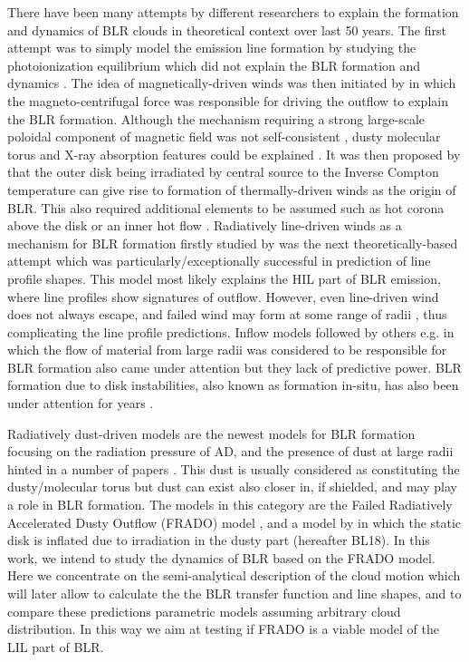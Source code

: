 \documentclass[twocolumn]{aastex62}
\begin{document}
There have been many attempts by different researchers to explain the formation and dynamics of BLR clouds in theoretical context over last 50 years.
The first attempt was to simply model the emission line formation by studying the photoionization equilibrium \citep{Osterbrock1978} which did not explain the BLR formation and dynamics \citep{Capriotti1980}.
The idea of magnetically-driven winds was then initiated by \cite{BlandfordPayne1982} in which the magneto-centrifugal force was responsible for driving the outflow to explain the BLR formation. Although the mechanism requiring a strong large-scale poloidal component of magnetic field was not self-consistent \citep{BalbusHawley1991}, dusty molecular torus and X-ray absorption features could be explained \citep{Elitzur2006, Fukumura2015,Huang2020}.
It was then proposed by \cite{Begelman1983} that the outer disk being irradiated by central source to the Inverse Compton temperature can give rise to formation of thermally-driven winds as the origin of BLR. This also required additional elements to be assumed such as hot corona above the disk or an inner hot flow \citep{Witt1997, BlandfordBegelman1999}. 
Radiatively line-driven winds as a mechanism for BLR formation firstly studied by \citep{murray1995} was the next theoretically-based attempt which was particularly/exceptionally successful in prediction of line profile shapes. This model most likely explains the HIL part of BLR emission, where line profiles show signatures of outflow. However, even line-driven wind does not always escape, and failed wind may form at some range of radii \citep{Risaliti2010}, thus complicating the line profile predictions.
Inflow models \citep{done1996} followed by others e.g. \citep{Hu2008, Wang2017} in which the flow of material from large radii was considered to be responsible for BLR formation also came under attention but they lack of predictive power.
BLR formation due to disk instabilities, also known as formation in-situ, has also been under attention for years \citep{Collin1999, Collin2008, Wang2011, Wang2012a}.

Radiatively dust-driven models are the newest models for BLR formation focusing on the radiation pressure of AD, and the presence of dust at large radii hinted in a number of papers \citep{Rees1969, Rieke1978, barvainis1987, Dong2008}. This dust is usually considered as constituting the dusty/molecular torus but dust can exist also closer in, if shielded, and may play a role in BLR formation. The models in this category are the Failed Radiatively Accelerated Dusty Outflow (FRADO) model \citep{Czerny2011}, and a model by \citet{baskin2018} in which the static disk is inflated due to irradiation in the dusty part (hereafter BL18).
In this work, we intend to study the dynamics of BLR based on the FRADO model.  Here we concentrate on the semi-analytical description of the cloud motion which will later allow to calculate the the BLR transfer function and line shapes, and to compare these predictions parametric models assuming arbitrary cloud distribution. In this way we aim at testing if FRADO is a viable model of the LIL part of BLR.
\end{document}
